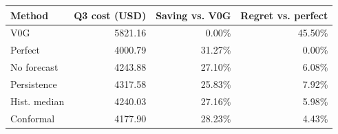 \begin{tabular}{lrrr}
\toprule
Method & Q3 cost (USD) & Saving vs. V0G & Regret vs. perfect \\
\midrule
V0G & 5821.16 & 0.00\% & 45.50\% \\
Perfect & 4000.79 & 31.27\% & 0.00\% \\
No forecast & 4243.88 & 27.10\% & 6.08\% \\
Persistence & 4317.58 & 25.83\% & 7.92\% \\
Hist. median & 4240.03 & 27.16\% & 5.98\% \\
Conformal & 4177.90 & 28.23\% & 4.43\% \\
\bottomrule
\end{tabular}
